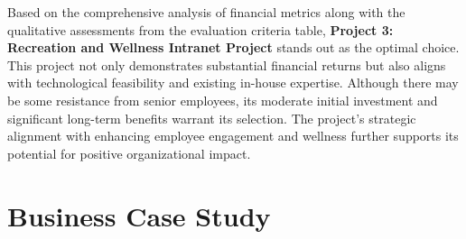 Based on the comprehensive analysis of financial metrics along with the qualitative assessments from the evaluation criteria table, \textbf{Project 3: Recreation and Wellness Intranet Project} stands out as the optimal choice. This project not only demonstrates substantial financial returns but also aligns with technological feasibility and existing in-house expertise. Although there may be some resistance from senior employees, its moderate initial investment and significant long-term benefits warrant its selection. The project's strategic alignment with enhancing employee engagement and wellness further supports its potential for positive organizational impact.


\section{Business Case Study}

